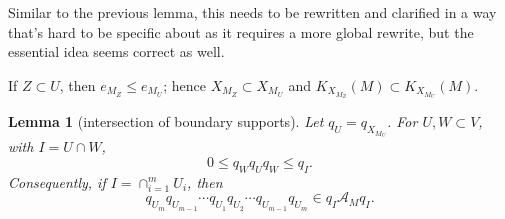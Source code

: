 \documentclass[12pt]{article}
\newtheorem{lemma}{Lemma}
\newcommand{\cA}{\mathcal A}
\newcommand{\review}[1]{\begin{reviewbox}#1\end{reviewbox}}
\begin{document}
\review{Similar to the previous lemma, this needs to be rewritten and clarified in a way that's hard to be specific about as it requires a more global rewrite, but the essential idea seems correct as well.}

If \(Z\subset U\), then \(e_{M_Z}\le e_{M_U}\); hence
\(X_{M_Z}\subset X_{M_U}\) and \(K_{X_{M_Z}}(M)\subset K_{X_{M_U}}(M)\).

\begin{lemma}[intersection of boundary supports]\label{lem:intersection}
Let \(q_U=q_{X_{M_U}}\).  For \(U,W\subset V\), with \(I=U\cap W\),
\[
        0\le q_Wq_Uq_W\le q_I .
\]
Consequently, if \(I=\cap_{i=1}^m U_i\), then
\[
q_{U_m}q_{U_{m-1}}\cdots q_{U_1}q_{U_2}\cdots q_{U_{m-1}}q_{U_m}
   \in q_I\cA_Mq_I .
\]
\end{lemma}
\end{document}

